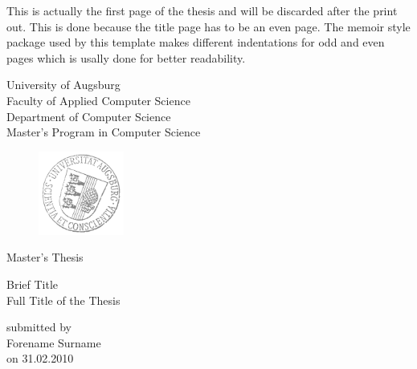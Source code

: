 \documentclass[12pt, a4paper, fleqn]{memoir}%
\begin{document}
\frontmatter

\pagestyle{empty}
This is actually the first page of the thesis and will be discarded after the print out. This is done because 
the title page has to be an even page. The memoir style package used by this template makes different indentations 
for odd and even pages which is usally done for better readability.  
\clearpage
\pagestyle{empty}
\rmfamily
\noindent
\begin{center}
University of Augsburg\\
Faculty of Applied Computer Science\\
Department of Computer Science\\
Master's Program in Computer Science\\
\end{center}
\begin{figure}[h]
\centering
\includegraphics[width=0.25\textwidth]{logo.png}
\end{figure}
\vfill\vfill
\begin{center}
\Large
Master's Thesis\\
\end{center}
\vspace{2.0em}
\begin{center}
\Large
\LARGE Brief Title\\ \vspace{10pt} 
\Large Full Title of the Thesis
\end{center}
\vspace{2.0em}
\begin{center}
    \normalsize
    submitted by\\
    \large
    Forename Surname\\
    \normalsize
    on 31.02.2010
\end{center}
\end{document}
